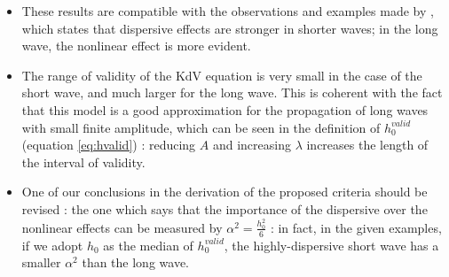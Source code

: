 \begin{itemize}
 \item These results are compatible with the observations and examples made by \cite{conservationLaws2002}, which states that dispersive effects are stronger in shorter waves; in the long wave, the nonlinear effect is more evident.
 \item The range of validity of the KdV equation is very small in the case of the short wave, and much larger for the long wave. This is coherent with the fact that this model is a good approximation for the propagation of long waves with small finite amplitude, which can be seen in the definition of $h_0^{valid}$ (equation \eqref{eq:hvalid}) : reducing $A$ and increasing $\lambda$ increases the length of the interval of validity.
 \item One of our conclusions in the derivation of the proposed criteria should be revised : the one which says that the importance of the dispersive over the nonlinear effects can be measured by $\alpha^2 = \frac{h_0^2}{6}$ : in fact, in the given examples, if we adopt $h_0$ as the median of $ h_0^{valid} $, the highly-dispersive short wave has a smaller $\alpha^2$ than the long wave.
\end{itemize} 